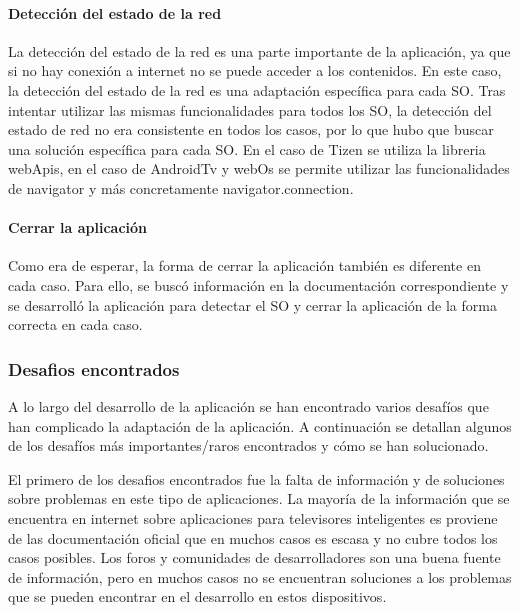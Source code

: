 \paragraph{Detección del estado de la red}
La detección del estado de la red es una parte importante de la aplicación, ya que si no hay conexión a internet no se
puede acceder a los contenidos. En este caso, la detección del estado de la red es una adaptación específica para cada SO.
Tras intentar utilizar las mismas funcionalidades para todos los SO, la detección del estado de red no era consistente
en todos los casos, por lo que hubo que buscar una solución específica para cada SO. En el caso de Tizen se utiliza la 
libreria webApis, en el caso de AndroidTv y webOs se permite utilizar las funcionalidades de navigator y más concretamente
navigator.connection.

\paragraph{Cerrar la aplicación}
Como era de esperar, la forma de cerrar la aplicación también es diferente en cada caso. Para ello, se buscó información
en la documentación correspondiente y se desarrolló la aplicación para detectar el SO y cerrar la aplicación de la forma
correcta en cada caso.


\subsubsection{Desafios encontrados}
\label{sec:desafios}

A lo largo del desarrollo de la aplicación se han encontrado varios desafíos que han complicado la adaptación de la
aplicación. A continuación se detallan algunos de los desafíos más importantes/raros encontrados y cómo se han solucionado.

El primero de los desafios encontrados fue la falta de información y de soluciones sobre problemas en este tipo de aplicaciones.
La mayoría de la información que se encuentra en internet sobre aplicaciones para televisores inteligentes es proviene de
las documentación oficial que en muchos casos es escasa y no cubre todos los casos posibles. Los foros y comunidades de
desarrolladores son una buena fuente de información, pero en muchos casos no se encuentran soluciones a los problemas
que se pueden encontrar en el desarrollo en estos dispositivos.

